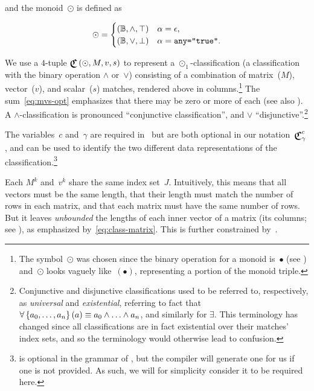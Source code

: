 \noindent
and the monoid~$\odot$ is defined as

\begin{equation}\label{eq:classify-rel}
  \odot = \begin{cases}
        \left({\mathbb{B}},{\land},{\top}\right) &\alpha = \epsilon,\\
        \left({\mathbb{B}},{\lor},{\bot}\right) &\alpha = \texttt{any="true"}.
      \end{cases}
\end{equation}


We use a $4$-tuple $\Classify\left(\odot,M,v,s\right)$ to represent a
  $\odot_1$-classification
    (a classification with the binary operation $\land$ or~$\lor$)
  consisting of a combination of matrix~($M$), vector~($v$), and
    scalar~($s$) matches,
      rendered above in columns.\footnote{%
        The symbol~$\odot$ was chosen since the binary operation for a monoid
          is~$\bullet$
            (see )
          and~$\odot$ looks vaguely like~$(\bullet)$,
            representing a portion of the monoid triple.}
The sum~\eqref{eq:mvs-opt} emphasizes that there may be zero or more of each
  (see also ).
A $\land$-classification is pronounced ``conjunctive classification'',
  and $\lor$ ``disjunctive''.\footnote{%
    Conjunctive and disjunctive classifications used to be referred to,
      respectively,
      as \emph{universal} and \emph{existential},
        referring to fact that
          $\forall\left\{a_0,\ldots,a_n\right\}(a) \equiv a_0\land\ldots\land a_n$,
            and similarly for $\exists$.
    This terminology has changed since all classifications are in fact
      existential over their matches' index sets,
        and so the terminology would otherwise lead to confusion.}

The variables~$c$ and~$\gamma$ are required in~\tame{} but are both optional
  in our notation~$\Classify^c_\gamma$,
    and can be used to identify the two different data representations of
    the classification.\footnote{%
       is optional in the grammar of \tame{},
        but the compiler will generate one for us if one is not provided.
      As such,
        we will for simplicity consider it to be required here.}

Each $M^k$ and~$v^k$ share the same index set~$J$.
Intuitively,
  this means that all vectors must be the same length,
  that their length must match the number of rows in each matrix,
  and that each matrix must have the same number of rows.
But it leaves \emph{unbounded} the lengths of each inner vector of a matrix
  (its columns; see ),
    as emphasized by~\eqref{eq:class-matrix}.
This is further constrained by~.

